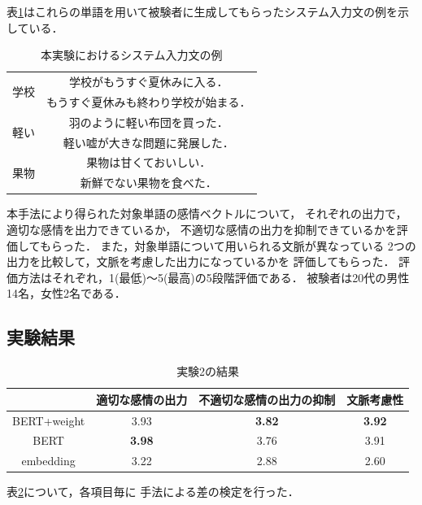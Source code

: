 		表\ref{table:jikken2_input_example}はこれらの単語を用いて被験者に生成してもらったシステム入力文の例を示している．
		\begin{table}[H]
			\centering
			\caption{本実験におけるシステム入力文の例}
			\label{table:jikken2_input_example}
			\begin{tabular}{|c|c|}
				\hline
				\multirow{2}{*}{学校} & 学校がもうすぐ夏休みに入る． \\
				\cline{2-2}
				& もうすぐ夏休みも終わり学校が始まる． \\
				\hline
				\multirow{2}{*}{軽い} & 羽のように軽い布団を買った． \\
				\cline{2-2}
				& 軽い嘘が大きな問題に発展した． \\
				\hline
				\multirow{2}{*}{果物} & 果物は甘くておいしい． \\
				\cline{2-2}
				& 新鮮でない果物を食べた． \\
				\hline
			\end{tabular}
		\end{table}
			
		本手法により得られた対象単語の感情ベクトルについて，
		それぞれの出力で，適切な感情を出力できているか，
		不適切な感情の出力を抑制できているかを評価してもらった．
		また，対象単語について用いられる文脈が異なっている
		2つの出力を比較して，文脈を考慮した出力になっているかを
		評価してもらった．
		評価方法はそれぞれ，1(最低)～5(最高)の5段階評価である．
		被験者は20代の男性14名，女性2名である．


	\subsection{実験結果}
	\begin{table}[H]
		\centering
		\caption{実験2の結果}
		\label{table:normal_word_result}
			\begin{tabular}{cccc}
				\hline
				& 適切な感情の出力 & 不適切な感情の出力の抑制 & 文脈考慮性 \\
				\hline \hline
				BERT+weight & 3.93 & \textbf{3.82} & \textbf{3.92} \\
				BERT & \textbf{3.98} & 3.76 & 3.91 \\
				embedding & 3.22 & 2.88 & 2.60 \\
				\hline
			\end{tabular}
	\end{table}

	表\ref{table:normal_word_result}について，各項目毎に
	手法による差の検定を行った．
